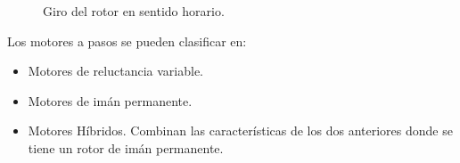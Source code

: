 \begin{figure}[h]
	\centering
	\caption{Giro del rotor en sentido horario.	\cite{BasicStepper}}
	\label{fig:pasodos}
\end{figure}

Los motores a pasos se pueden clasificar en:
\begin{itemize}
	\item Motores de reluctancia variable.
	
	\item Motores de  imán permanente.
	
	\item Motores Híbridos.
	Combinan las características de los dos anteriores donde se tiene un rotor de imán permanente.
\end{itemize}


